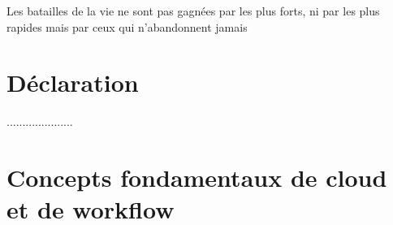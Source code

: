 \documentclass[12pt,twoside]{report}
\author{Zerrouki Djamel}
\theoremstyle{plain}
\theoremstyle{definition}
\theoremstyle{Remarque}
\begin{document}
 
 
 
 
 
 



\clearpage

\printglossary[title=Special Terms, toctitle=List of terms]
 
 
 



 
 
 
Les batailles de la vie ne sont pas gagnées par les plus forts, ni par les plus rapides mais par ceux qui n'abandonnent jamais




  

\chapter*{Déclaration}
.....................





 



\tableofcontents

\listoffigures

\listoftables



 
\chapter{Concepts fondamentaux de cloud et de workflow }


%
\end{document}
